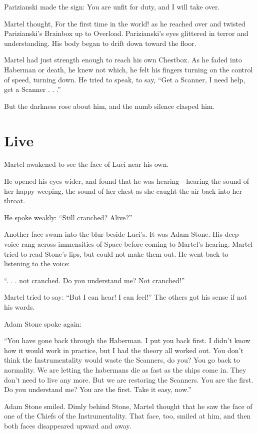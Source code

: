 Parizianski made the sign: You are unfit for duty, and I will take over.

Martel thought, For the first time in the world! as he reached over and twisted Parizianski's Brainbox up to Overload. Parizianski's eyes glittered in terror and understanding. His body began to drift down toward the floor.

Martel had just strength enough to reach his own Chestbox. As he faded into Haberman or death, he knew not which, he felt his fingers turning on the control of speed, turning down. He tried to speak, to say, ``Get a Scanner, I need help, get a Scanner . . .''

But the darkness rose about him, and the numb silence clasped him.

 
\section{Live}

Martel awakened to see the face of Luci near his own.

He opened his eyes wider, and found that he was hearing---hearing the sound of her happy weeping, the sound of her chest as she caught the air back into her throat.

He spoke weakly: ``Still cranched? Alive?''

Another face swam into the blur beside Luci's. It was Adam Stone. His deep voice rang across immensities of Space before coming to Martel's hearing. Martel tried to read Stone's lips, but could not make them out. He went back to listening to the voice:

``. . . not cranched. Do you understand me? Not cranched!''

Martel tried to say: ``But I can hear! I can feel!'' The others got his sense if not his words.

Adam Stone spoke again:

``You have gone back through the Haberman. I put you back first. I didn't know how it would work in practice, but I had the theory all worked out. You don't think the Instrumentality would waste the Scanners, do you? You go back to normality. We are letting the habermans die as fast as the ships come in. They don't need to live any more. But we are restoring the Scanners. You are the first. Do you understand me? You are the first. Take it easy, now.''

Adam Stone smiled. Dimly behind Stone, Martel thought that he saw the face of one of the Chiefs of the Instrumentality. That face, too, smiled at him, and then both faces disappeared upward and away.

